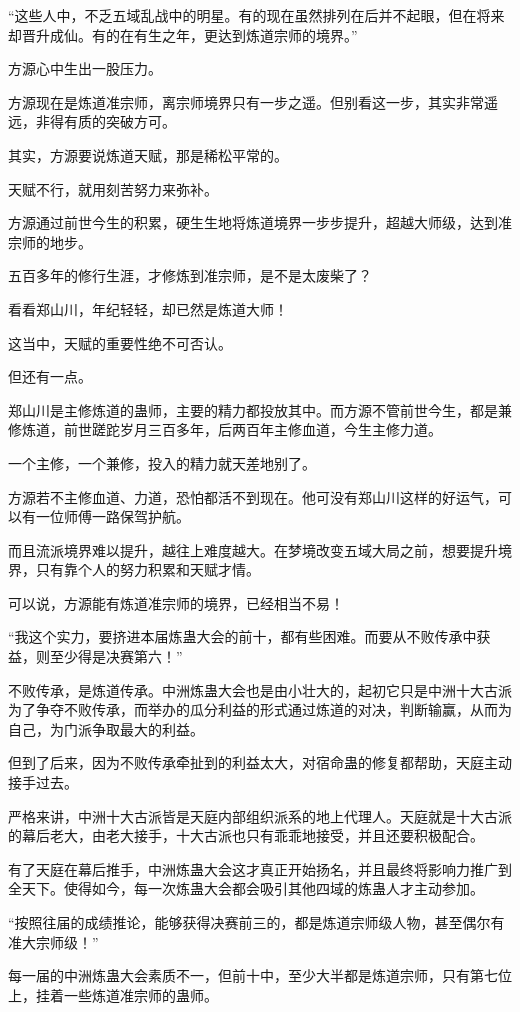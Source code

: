 \begin{this_body}
“这些人中，不乏五域乱战中的明星。有的现在虽然排列在后并不起眼，但在将来却晋升成仙。有的在有生之年，更达到炼道宗师的境界。”

方源心中生出一股压力。

方源现在是炼道准宗师，离宗师境界只有一步之遥。但别看这一步，其实非常遥远，非得有质的突破方可。

其实，方源要说炼道天赋，那是稀松平常的。

天赋不行，就用刻苦努力来弥补。

方源通过前世今生的积累，硬生生地将炼道境界一步步提升，超越大师级，达到准宗师的地步。

五百多年的修行生涯，才修炼到准宗师，是不是太废柴了？

看看郑山川，年纪轻轻，却已然是炼道大师！

这当中，天赋的重要性绝不可否认。

但还有一点。

郑山川是主修炼道的蛊师，主要的精力都投放其中。而方源不管前世今生，都是兼修炼道，前世蹉跎岁月三百多年，后两百年主修血道，今生主修力道。

一个主修，一个兼修，投入的精力就天差地别了。

方源若不主修血道、力道，恐怕都活不到现在。他可没有郑山川这样的好运气，可以有一位师傅一路保驾护航。

而且流派境界难以提升，越往上难度越大。在梦境改变五域大局之前，想要提升境界，只有靠个人的努力积累和天赋才情。

可以说，方源能有炼道准宗师的境界，已经相当不易！

“我这个实力，要挤进本届炼蛊大会的前十，都有些困难。而要从不败传承中获益，则至少得是决赛第六！”

不败传承，是炼道传承。中洲炼蛊大会也是由小壮大的，起初它只是中洲十大古派为了争夺不败传承，而举办的瓜分利益的形式通过炼道的对决，判断输赢，从而为自己，为门派争取最大的利益。

但到了后来，因为不败传承牵扯到的利益太大，对宿命蛊的修复都帮助，天庭主动接手过去。

严格来讲，中洲十大古派皆是天庭内部组织派系的地上代理人。天庭就是十大古派的幕后老大，由老大接手，十大古派也只有乖乖地接受，并且还要积极配合。

有了天庭在幕后推手，中洲炼蛊大会这才真正开始扬名，并且最终将影响力推广到全天下。使得如今，每一次炼蛊大会都会吸引其他四域的炼蛊人才主动参加。

“按照往届的成绩推论，能够获得决赛前三的，都是炼道宗师级人物，甚至偶尔有准大宗师级！”

每一届的中洲炼蛊大会素质不一，但前十中，至少大半都是炼道宗师，只有第七位上，挂着一些炼道准宗师的蛊师。


\end{this_body}
